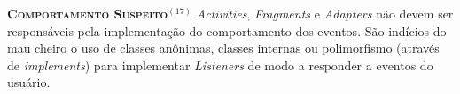  \noindent
  \textsc{\textbf{{\small Comportamento Suspeito}}}$^{(17)}$ \textit{Activities}, \textit{Fragments} e \textit{Adapters} não devem ser responsáveis pela implementação do comportamento dos eventos. São indícios do mau cheiro o uso de classes anônimas, classes internas ou polimorfismo (através de \textit{implements}) para implementar \textit{Listeners} de modo a responder a eventos do usuário.



